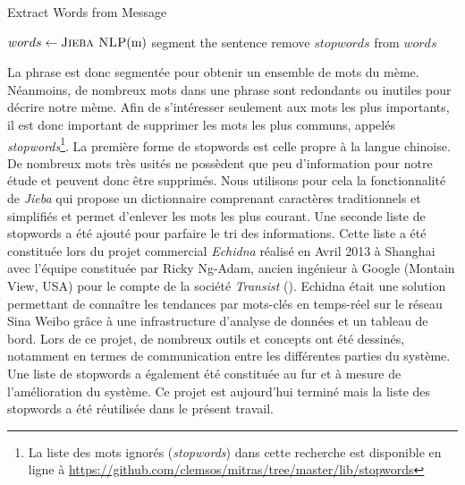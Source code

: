     \begin{algorithm}[h]
        \caption{Extract Words from Message}
        \label{algo:message-graph}
        \begin{algorithmic}

                \State $words \gets \Call{Jieba NLP}{$m$}$ segment the sentence
                \State remove $stopwords$ from $words$                

        \end{algorithmic}
    \end{algorithm}

    La phrase est donc segmentée  pour obtenir un ensemble de mots du mème. Néanmoins, de nombreux mots dans une phrase sont redondants ou inutiles pour décrire notre mème. Afin de s'intéresser seulement aux mots les plus importants, il est donc important de  supprimer les mots les plus communs, appelés \textit{stopwords}\footnote{La liste des mots ignorés (\textit{stopwords}) dans cette recherche est disponible en ligne à \url{https://github.com/clemsos/mitras/tree/master/lib/stopwords}}. La première forme de stopwords est celle propre à la langue chinoise. De nombreux mots très usités ne possèdent que peu d'information pour notre étude et peuvent donc être supprimés. Nous utilisons pour cela la fonctionnalité de \textit{Jieba} qui propose un dictionnaire comprenant caractères traditionnels et simplifiés et permet d'enlever les mots les plus courant. Une seconde liste de stopwords a été ajouté pour parfaire le tri des informations. Cette liste a été constituée lors du projet commercial \textit{Echidna} réalisé en Avril 2013 à Shanghai avec l'équipe constituée par Ricky Ng-Adam, ancien ingénieur à Google (Montain View, USA) pour le compte de la société \textit{Transist} (). Echidna était une solution permettant de connaître les tendances par mots-clés en temps-réel sur le réseau Sina Weibo grâce à une infrastructure d'analyse de données et un tableau de bord. Lors de ce projet, de nombreux outils et concepts ont été dessinés, notamment en termes de communication entre les différentes parties du système. Une liste de stopwords a également été constituée au fur et à mesure de l'amélioration du système. Ce projet est aujourd'hui terminé mais la liste des stopwords a été réutilisée dans le présent travail.
    
